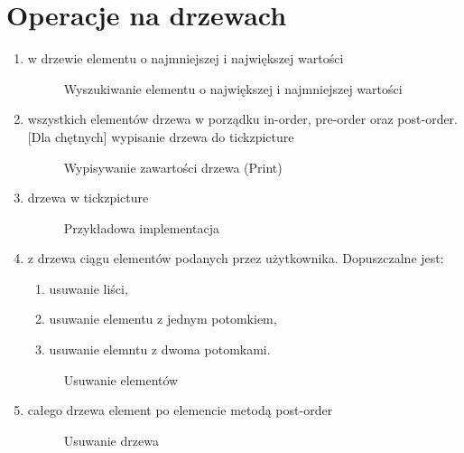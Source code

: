 \newpage


\section{Operacje na drzewach}

\begin{multicols}{2}
  \begin{enumerate}[series=actions]
    \item \textcolor{PUT-Blue}{} w drzewie elementu o najmniejszej i największej wartości
    \begin{figure} [H]
        \centering
         
        \caption{Wyszukiwanie elementu o największej i najmniejszej wartości}
        \label{fig:tree:search}
    \end{figure}
    
    \item \textcolor{PUT-Blue}{} wszystkich elementów drzewa w porządku in-order, pre-order oraz post-order. [Dla chętnych] wypisanie drzewa do tickzpicture
    \begin{figure} [H]
        \centering
        
        \caption{Wypisywanie zawartości drzewa (Print)}
        \label{fig:tree:search}
    \end{figure}

    \item \textcolor{PUT-Blue}{} drzewa w tickzpicture 
    \begin{figure} [H]
        \centering
        
        \caption{Przykładowa implementacja}
        \label{fig:tree:export:code}
    \end{figure}

    \item \textcolor{PUT-Blue}{} z drzewa ciągu elementów podanych przez użytkownika. Dopuszczalne jest:
    \begin{enumerate}[label=(\alph*)]
        \item usuwanie liści,
        \item usuwanie elementu z jednym potomkiem, 
        \item usuwanie elemntu z dwoma potomkami.
    \end{enumerate}   
    \begin{figure} [H]
        \centering
         
        \caption{Usuwanie elementów}
        \label{fig:tree:search}
    \end{figure}

    \item \textcolor{PUT-Blue}{} całego drzewa element po elemencie metodą post-order 
    \begin{figure} [H]
        \centering
         
        \caption{Usuwanie drzewa}
        \label{fig:tree:search}
    \end{figure}

    
  \end{enumerate}
\end{multicols}



